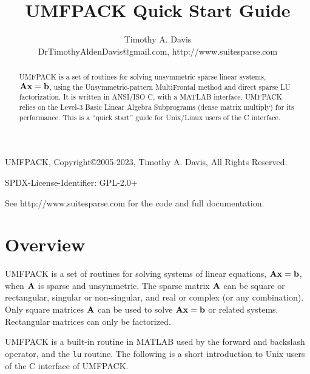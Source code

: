 \documentclass[11pt]{article}
\newcommand{\m}[1]{{\bf{#1}}}       %
\begin{document}
\author{Timothy A. Davis \\
DrTimothyAldenDavis@gmail.com, http://www.suitesparse.com}
\title{UMFPACK Quick Start Guide}

\maketitle

\begin{abstract}
    UMFPACK is a set of routines for solving unsymmetric sparse linear
    systems, $\m{Ax}=\m{b}$, using the Unsymmetric-pattern MultiFrontal method
    and direct sparse LU factorization.  It is written in ANSI/ISO C, with a
    MATLAB interface.  UMFPACK relies on the Level-3
    Basic Linear Algebra Subprograms (dense matrix multiply) for its
    performance.
    This is a ``quick start'' guide for Unix/Linux users of the C interface.
\end{abstract}

UMFPACK, Copyright\copyright 2005-2023, Timothy A. Davis, All Rights Reserved.

SPDX-License-Identifier: GPL-2.0+

See http://www.suitesparse.com
for the code and full documentation.

\section{Overview}

UMFPACK is a set of routines for solving systems of linear
equations, $\m{Ax}=\m{b}$, when $\m{A}$ is sparse and unsymmetric.
The sparse matrix $\m{A}$ can be square or rectangular, singular
or non-singular, and real or complex (or any combination).  Only square
matrices $\m{A}$ can be used to solve $\m{Ax}=\m{b}$ or related systems.
Rectangular matrices can only be factorized.

UMFPACK is a built-in routine in MATLAB used by the forward and
backslash operator, and the {\tt lu} routine.
The following is a short
introduction to Unix users of the C interface of UMFPACK.

\end{document}
